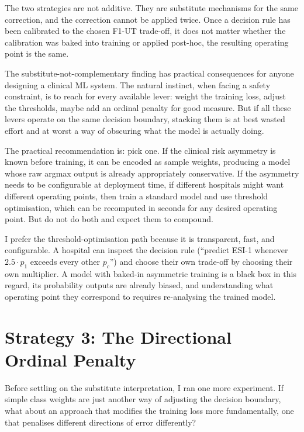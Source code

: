 The two strategies are not additive. They are substitute mechanisms for the same correction, and the correction cannot be applied twice. Once a decision rule has been calibrated to the chosen F1-UT trade-off, it does not matter whether the calibration was baked into training or applied post-hoc, the resulting operating point is the same.

\begin{remarkbox}
The substitute-not-complementary finding has practical consequences for anyone designing a clinical ML system. The natural instinct, when facing a safety constraint, is to reach for every available lever: weight the training loss, adjust the thresholds, maybe add an ordinal penalty for good measure. But if all these levers operate on the same decision boundary, stacking them is at best wasted effort and at worst a way of obscuring what the model is actually doing.

The practical recommendation is: pick one. If the clinical risk asymmetry is known before training, it can be encoded as sample weights, producing a model whose raw argmax output is already appropriately conservative. If the asymmetry needs to be configurable at deployment time, if different hospitals might want different operating points, then train a standard model and use threshold optimisation, which can be recomputed in seconds for any desired operating point. But do not do both and expect them to compound.

I prefer the threshold-optimisation path because it is transparent, fast, and configurable. A hospital can inspect the decision rule (``predict ESI-1 whenever $2.5 \cdot p_1$ exceeds every other $p_c$'') and choose their own trade-off by choosing their own multiplier. A model with baked-in asymmetric training is a black box in this regard, its probability outputs are already biased, and understanding what operating point they correspond to requires re-analysing the trained model.
\end{remarkbox}

\section{Strategy 3: The Directional Ordinal Penalty}

Before settling on the substitute interpretation, I ran one more experiment. If simple class weights are just another way of adjusting the decision boundary, what about an approach that modifies the training loss more fundamentally, one that penalises different directions of error differently?


